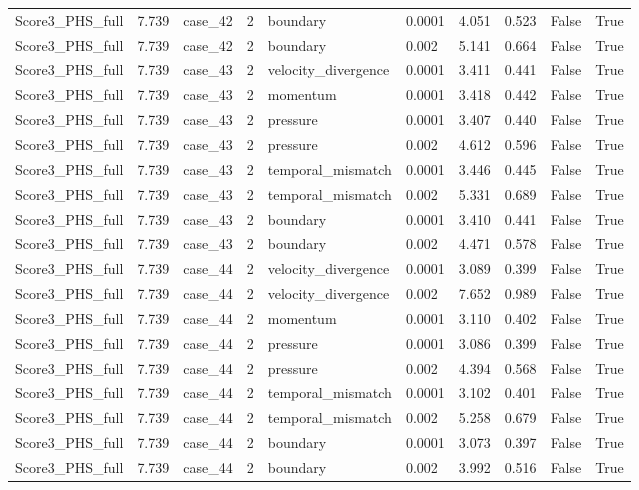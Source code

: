 \begin{longtable}{llllllllll}
Score3\_PHS\_full & 7.739 & case\_42 & 2 & boundary & 0.0001 & 4.051 & 0.523 & False & True \\
Score3\_PHS\_full & 7.739 & case\_42 & 2 & boundary & 0.002 & 5.141 & 0.664 & False & True \\
Score3\_PHS\_full & 7.739 & case\_43 & 2 & velocity\_divergence & 0.0001 & 3.411 & 0.441 & False & True \\
Score3\_PHS\_full & 7.739 & case\_43 & 2 & momentum & 0.0001 & 3.418 & 0.442 & False & True \\
Score3\_PHS\_full & 7.739 & case\_43 & 2 & pressure & 0.0001 & 3.407 & 0.440 & False & True \\
Score3\_PHS\_full & 7.739 & case\_43 & 2 & pressure & 0.002 & 4.612 & 0.596 & False & True \\
Score3\_PHS\_full & 7.739 & case\_43 & 2 & temporal\_mismatch & 0.0001 & 3.446 & 0.445 & False & True \\
Score3\_PHS\_full & 7.739 & case\_43 & 2 & temporal\_mismatch & 0.002 & 5.331 & 0.689 & False & True \\
Score3\_PHS\_full & 7.739 & case\_43 & 2 & boundary & 0.0001 & 3.410 & 0.441 & False & True \\
Score3\_PHS\_full & 7.739 & case\_43 & 2 & boundary & 0.002 & 4.471 & 0.578 & False & True \\
Score3\_PHS\_full & 7.739 & case\_44 & 2 & velocity\_divergence & 0.0001 & 3.089 & 0.399 & False & True \\
Score3\_PHS\_full & 7.739 & case\_44 & 2 & velocity\_divergence & 0.002 & 7.652 & 0.989 & False & True \\
Score3\_PHS\_full & 7.739 & case\_44 & 2 & momentum & 0.0001 & 3.110 & 0.402 & False & True \\
Score3\_PHS\_full & 7.739 & case\_44 & 2 & pressure & 0.0001 & 3.086 & 0.399 & False & True \\
Score3\_PHS\_full & 7.739 & case\_44 & 2 & pressure & 0.002 & 4.394 & 0.568 & False & True \\
Score3\_PHS\_full & 7.739 & case\_44 & 2 & temporal\_mismatch & 0.0001 & 3.102 & 0.401 & False & True \\
Score3\_PHS\_full & 7.739 & case\_44 & 2 & temporal\_mismatch & 0.002 & 5.258 & 0.679 & False & True \\
Score3\_PHS\_full & 7.739 & case\_44 & 2 & boundary & 0.0001 & 3.073 & 0.397 & False & True \\
Score3\_PHS\_full & 7.739 & case\_44 & 2 & boundary & 0.002 & 3.992 & 0.516 & False & True \\

\end{longtable}
